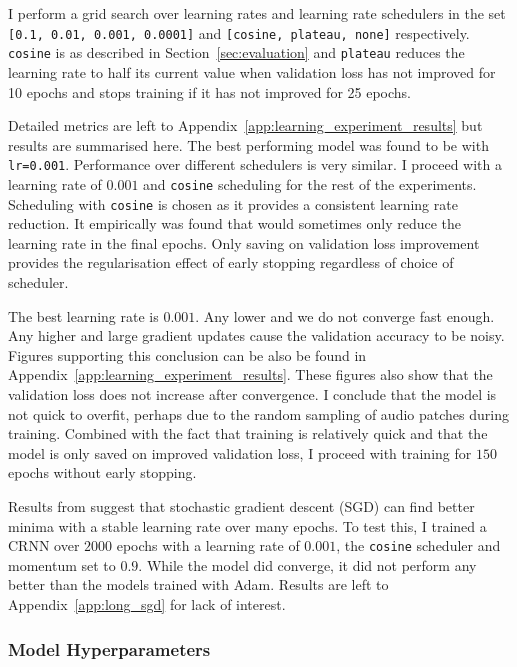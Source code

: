 I perform a grid search over learning rates and learning rate schedulers in the set \texttt{[0.1, 0.01, 0.001, 0.0001]} and \texttt{[cosine, plateau, none]} respectively. \texttt{cosine} is as described in Section~\ref{sec:evaluation} and \texttt{plateau} reduces the learning rate to half its current value when validation loss has not improved for 10 epochs and stops training if it has not improved for 25 epochs.

Detailed metrics are left to Appendix~\ref{app:learning_experiment_results} but results are summarised here. The best performing model was found to be with \texttt{lr=0.001}. Performance over different schedulers is very similar. I proceed with a learning rate of $0.001$ and \texttt{cosine} scheduling for the rest of the experiments. Scheduling with \texttt{cosine} is chosen as it provides a consistent learning rate reduction. It empirically was found that  would sometimes only reduce the learning rate in the final epochs. Only saving on validation loss improvement provides the regularisation effect of early stopping regardless of choice of scheduler.

The best learning rate is $0.001$. Any lower and we do not converge fast enough. Any higher and large gradient updates cause the validation accuracy to be noisy. Figures supporting this conclusion can be also be found in Appendix~\ref{app:learning_experiment_results}. These figures also show that the validation loss does not increase after convergence. I conclude that the model is not quick to overfit, perhaps due to the random sampling of audio patches during training. Combined with the fact that training is relatively quick and that the model is only saved on improved validation loss, I proceed with training for $150$ epochs without early stopping.

Results from \citet{SGD1} suggest that stochastic gradient descent (SGD) can find better minima with a stable learning rate over many epochs. To test this, I trained a CRNN over $2000$ epochs with a learning rate of $0.001$, the \texttt{cosine} scheduler and momentum set to $0.9$. While the model did converge, it did not perform any better than the models trained with Adam. Results are left to Appendix~\ref{app:long_sgd} for lack of interest.

\subsubsection{Model Hyperparameters}\label{sec:model_hyperparameters}

